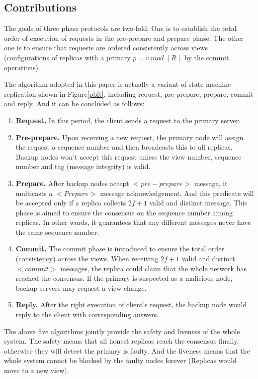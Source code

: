 \documentclass[conference]{IEEEtran}
\begin{document}
\subsection{Contributions}
The goals of three phase protocols are two-fold.
%
One is to establish the total order of execution of requests in the pre-prepare and prepare phase.
%
The other one is to ensure that requests are ordered consistently across views (configurations of replicas with a primary $p = v\ mod\ {\mid} R \mid$ by the commit operations).

The algorithm adopted in this paper is actually a variant of state machine replication shown in Figure\ref{pbft}, including request, pre-prepare, prepare, commit and reply.
%
And it can be concluded as follows:

\begin{enumerate}[label=(\roman*)]
    \item \textbf{Request.} In this period, the client sends a request to the primary server.
    \item \textbf{Pre-prepare.} Upon receiving a new request, the primary node will assign the request a sequence number and then broadcasts this to all replicas. 
    Backup nodes won't accept this request unless the view number, sequence number and tag (message integrity) is valid.
    \item \textbf{Prepare.} After backup nodes accept ${<}pre{-}prepare{>}$ message, it multicasts a ${<}Prepare{>}$ message acknowledgement.
    And this predicate will be accepted only if a replica collects $2f+1$ valid and distinct message. This phase is aimed to ensure the consensus on the sequence number among replicas. 
    In other words, it guarantees that any different messages never have the same sequence number.
    \item \textbf{Commit.} The commit phase is introduced to ensure the total order (consistency) across the views. 
    When receiving $2f+1$ valid and distinct ${<}commit{>}$ messages, the replica could claim that the whole network has reached the consensus.  
    If the primary is suspected as a malicious node, backup servers may request a view change. 
    \item \textbf{Reply.} After the right execution of client's request, the backup node would reply to the client with corresponding answers.
\end{enumerate}

The above five algorithms jointly provide the safety and liveness of the whole system.
%
The safety means that all honest replicas reach the consensus finally, otherwise they will detect the primary is faulty.
%
And the liveness means that the whole system cannot be blocked by the faulty nodes forever (Replicas would move to a new view).
\end{document}
